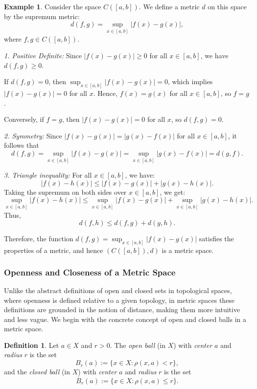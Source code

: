 \documentclass[12pt, reqno]{amsart}
\theoremstyle{definition}
\newtheorem{definition}[theorem]{Definition}
\newtheorem{example}[theorem]{Example}
\numberwithin{equation}{section}
\begin{document}
    \begin{example}
    Consider the space \( C([a, b]) \). We define a metric \( d \) on this space by the supremum metric:
$$
d(f, g) = \sup_{x \in [a, b]} |f(x) - g(x)|,
$$
where \( f, g \in C([a, b]) \).
    
\textit{1. Positive Definite:} Since \( |f(x) - g(x)| \geq 0 \) for all \( x \in [a, b] \), we have \( d(f, g) \geq 0 \).

If \( d(f, g) = 0 \), then \( \sup_{x \in [a, b]} |f(x) - g(x)| = 0 \), which implies \( |f(x) - g(x)| = 0 \) for all \( x \). Hence, \( f(x) = g(x) \) for all \( x \in [a, b] \), so \( f = g \).

Conversely, if \( f = g \), then \( |f(x) - g(x)| = 0 \) for all \( x \), so \( d(f, g) = 0 \).

\textit{2. Symmetry:} Since \( |f(x) - g(x)| = |g(x) - f(x)| \) for all \( x \in [a, b] \), it follows that
$$
d(f, g) = \sup_{x \in [a, b]} |f(x) - g(x)| = \sup_{x \in [a, b]} |g(x) - f(x)| = d(g, f).
$$

\textit{3. Triangle inequality:} For all \( x \in [a, b] \), we have:
$$
|f(x) - h(x)| \leq |f(x) - g(x)| + |g(x) - h(x)|.
$$
Taking the supremum on both sides over \( x \in [a, b] \), we get:
$$
\sup_{x \in [a, b]} |f(x) - h(x)| \leq \sup_{x \in [a, b]} |f(x) - g(x)| + \sup_{x \in [a, b]} |g(x) - h(x)|.
$$
Thus,
$$
d(f, h) \leq d(f, g) + d(g, h).
$$

Therefore, the function \( d(f, g) = \sup_{x \in [a, b]} |f(x) - g(x)| \) satisfies the properties of a metric, and hence \( (C([a, b]), d) \) is a metric space.
\end{example}

\subsubsection{Openness and Closeness of a Metric Space}
Unlike the abstract definitions of open and closed sets in topological spaces, where openness is defined relative to a given topology, in metric spaces these definitions are grounded in the notion of distance, making them more intuitive and less vague. We begin with the concrete concept of open and closed balls in a metric space.
\begin{definition}
    Let \(a \in X\) and \(r > 0\). The \textit{open ball} (in \(X\)) with \textit{center} \(a\) and \textit{radius} \(r\) is the set
    \[
    B_r(a) := \{x \in X : \rho(x, a) < r\},
    \]
    and the \textit{closed ball} (in \(X\)) with \textit{center} \(a\) and \textit{radius} \(r\) is the set
    \[
    \overline{B}_r(a) := \{x \in X : \rho(x, a) \leq r\}.
    \]
\end{definition}
\end{document}
